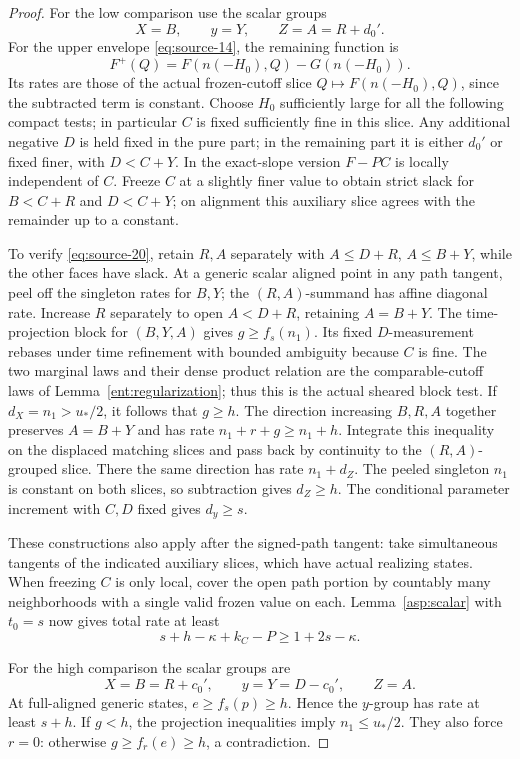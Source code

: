\begin{proof}
For the low comparison use the scalar groups
\[
X=B,\qquad y=Y,\qquad Z=A=R+d_0'.
\]
For the upper envelope \eqref{eq:source-14}, the remaining function is
\[
F^+(Q)=F(n(-H_0),Q)-G(n(-H_0)).
\]
Its rates are those of the actual frozen-cutoff slice
\(Q\mapsto F(n(-H_0),Q)\), since the subtracted term is constant.
Choose \(H_0\) sufficiently large for all the following compact tests;
in particular \(C\) is fixed sufficiently fine in this slice.
Any additional negative \(D\) is held fixed in the pure part;
in the remaining part it is either \(d_0'\) or fixed finer, with
\(D<C+Y\). In the exact-slope version \(F-PC\) is locally independent
of \(C\). Freeze \(C\) at a slightly finer value to obtain strict slack
for \(B<C+R\) and \(D<C+Y\); on alignment this auxiliary slice agrees
with the remainder up to a constant.

To verify \eqref{eq:source-20}, retain \(R,A\) separately with
\(A\le D+R\), \(A\le B+Y\), while the other faces have slack. At a
generic scalar aligned point in any path tangent, peel off the singleton
rates for \(B,Y\); the \((R,A)\)-summand has affine diagonal rate.
Increase \(R\) separately to open \(A<D+R\), retaining \(A=B+Y\).
The time-projection block for \((B,Y,A)\) gives
\(g\ge f_s(n_1)\). Its fixed \(D\)-measurement rebases under time
refinement with bounded ambiguity because \(C\) is fine. The two marginal
laws and their dense product relation are the comparable-cutoff laws of
Lemma~\ref{ent:regularization}; thus this is the actual sheared block
test. If \(d_X=n_1>u_*/2\), it follows that \(g\ge h\).
The direction increasing \(B,R,A\) together preserves \(A=B+Y\)
and has rate \(n_1+r+g\ge n_1+h\). Integrate this inequality on
the displaced matching slices and pass back by continuity to the
\((R,A)\)-grouped slice. There the same direction has rate
\(n_1+d_Z\). The peeled singleton \(n_1\) is constant on both slices,
so subtraction gives \(d_Z\ge h\). The conditional parameter
increment with \(C,D\) fixed gives \(d_y\ge s\).

These constructions also apply after the signed-path tangent: take
simultaneous tangents of the indicated auxiliary slices, which have actual
realizing states. When freezing \(C\) is only local, cover the open path
portion by countably many neighborhoods with a single valid frozen value
on each. Lemma~\ref{asp:scalar} with \(t_0=s\) now gives total rate at least
\[
s+h-\kappa+k_C-P\ge1+2s-\kappa.
\]

For the high comparison the scalar groups are
\[
X=B=R+c_0',\qquad y=Y=D-c_0',\qquad Z=A.
\]
At full-aligned generic states, \(e\ge f_s(p)\ge h\). Hence the
\(y\)-group has rate at least \(s+h\). If \(g<h\), the projection
inequalities imply \(n_1\le u_*/2\). They also force \(r=0\): otherwise
\(g\ge f_r(e)\ge h\), a contradiction.


\end{proof}
